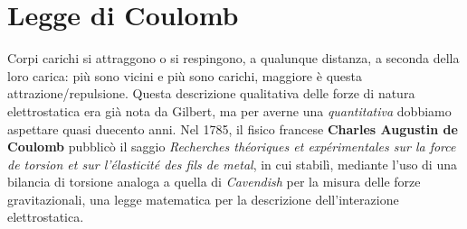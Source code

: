 \section{Legge di Coulomb}
Corpi carichi si attraggono o si respingono, a qualunque distanza, a seconda della loro carica: più sono vicini e più sono carichi, maggiore è questa attrazione/repulsione. Questa descrizione qualitativa delle forze di natura elettrostatica era già nota da Gilbert, ma per averne una \textit{quantitativa} dobbiamo aspettare quasi duecento anni.
Nel 1785, il fisico francese \textbf{Charles Augustin de Coulomb} pubblicò il saggio \textit{Recherches théoriques et expérimentales sur la force de torsion et sur l'élasticité des fils de metal}, in cui stabilì, mediante l'uso di una bilancia di torsione analoga a quella di \textit{Cavendish} per la misura delle forze gravitazionali, una legge matematica per la descrizione dell'interazione elettrostatica.
